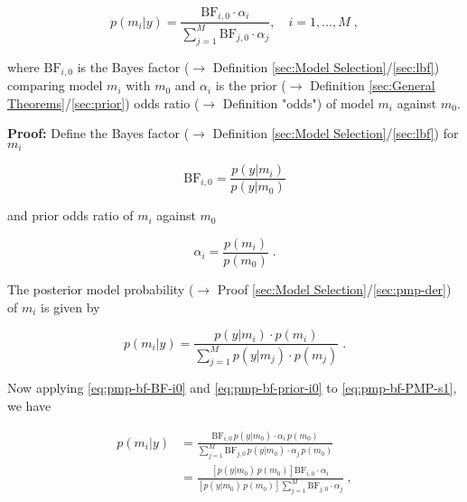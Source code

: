 \documentclass[a4paper,12pt,twoside]{book}
\begin{document}
\begin{equation} \label{eq:pmp-bf-PMP-BF}
p(m_i|y) = \frac{\mathrm{BF}_{i,0} \cdot \alpha_i}{\sum_{j=1}^{M} \mathrm{BF}_{j,0} \cdot \alpha_j}, \quad i = 1,\ldots,M \; ,
\end{equation}

where $\mathrm{BF}_{i,0}$ is the Bayes factor ($\rightarrow$ Definition \ref{sec:Model Selection}/\ref{sec:lbf}) comparing model $m_i$ with $m_0$ and $\alpha_i$ is the prior ($\rightarrow$ Definition \ref{sec:General Theorems}/\ref{sec:prior}) odds ratio ($\rightarrow$ Definition "odds") of model $m_i$ against $m_0$.


\vspace{1em}
\textbf{Proof:} Define the Bayes factor ($\rightarrow$ Definition \ref{sec:Model Selection}/\ref{sec:lbf}) for $m_i$

\begin{equation} \label{eq:pmp-bf-BF-i0}
\mathrm{BF}_{i,0} = \frac{p(y|m_i)}{p(y|m_0)}
\end{equation}

and prior odds ratio of $m_i$ against $m_0$

\begin{equation} \label{eq:pmp-bf-prior-i0}
\alpha_i = \frac{p(m_i)}{p(m_0)} \; .
\end{equation}

The posterior model probability ($\rightarrow$ Proof \ref{sec:Model Selection}/\ref{sec:pmp-der}) of $m_i$ is given by

\begin{equation} \label{eq:pmp-bf-PMP-s1}
p(m_i|y) = \frac{p(y|m_i) \cdot p(m_i)}{\sum_{j=1}^{M} p(y|m_j) \cdot p(m_j)} \; .
\end{equation}

Now applying \eqref{eq:pmp-bf-BF-i0} and \eqref{eq:pmp-bf-prior-i0} to \eqref{eq:pmp-bf-PMP-s1}, we have

\begin{equation} \label{eq:pmp-bf-PMP-s2}
\begin{split}
p(m_i|y) &= \frac{ \mathrm{BF}_{i,0} \, p(y|m_0) \cdot \alpha_i \, p(m_0)}{\sum_{j=1}^{M} \mathrm{BF}_{j,0} \, p(y|m_0) \cdot \alpha_j \, p(m_0)} \\
&= \frac{\left[ p(y|m_0) \, p(m_0) \right] \mathrm{BF}_{i,0} \cdot \alpha_i}{\left[ p(y|m_0) \, p(m_0) \right] \sum_{j=1}^{M} \mathrm{BF}_{j,0} \cdot \alpha_j} \; ,
\end{split}
\end{equation}
\end{document}
